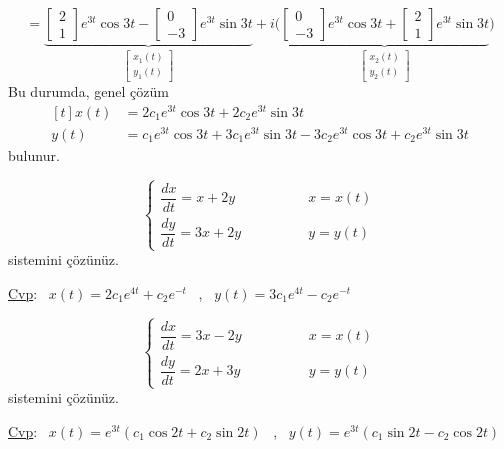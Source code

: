 \documentclass[11pt,a4paper]{article}
\begin{document}
\begin{cozum}
\[= \underbrace{\begin{bmatrix} 2 \\ 1 \end{bmatrix}e^{3t}\cos 3t - \begin{bmatrix} 0 \\ -3 \end{bmatrix}e^{3t}\sin 3t}_{\begin{bmatrix} x_1(t) \\ y_1(t) \end{bmatrix}} + i\Biggl(\underbrace{\begin{bmatrix} 0 \\ -3 \end{bmatrix}e^{3t}\cos 3t + \begin{bmatrix} 2 \\ 1 \end{bmatrix}e^{3t}\sin 3t}_{\begin{bmatrix} x_2(t) \\ y_2(t) \end{bmatrix}}\Biggr)
\]
Bu durumda, genel çözüm
\[
\begin{aligned}[t] x(t) &= 2c_1e^{3t}\cos 3t + 2c_2e^{3t}\sin 3t \\ y(t) &= c_1e^{3t}\cos 3t + 3c_1e^{3t}\sin 3t - 3c_2e^{3t}\cos 3t + c_2e^{3t}\sin 3t \end{aligned}
\]
bulunur.
\end{cozum}

\begin{ornek}[(ÖDEV)]
\[
\begin{cases} \dfrac{dx}{dt} = x + 2y & \qquad\qquad x = x(t) \\[3mm] \dfrac{dy}{dt} = 3x + 2y & \qquad\qquad y = y(t) \end{cases}
\]
sistemini çözünüz.

\underline{Cvp}: \ $x(t) = 2c_1e^{4t} + c_2e^{-t}$ \ , \ $y(t) = 3c_1e^{4t} - c_2e^{-t}$
\end{ornek}

\begin{ornek}[(ÖDEV)]
\[
\begin{cases} \dfrac{dx}{dt} = 3x - 2y & \qquad\qquad x = x(t) \\[3mm] \dfrac{dy}{dt} = 2x + 3y & \qquad\qquad y = y(t) \end{cases}
\]
sistemini çözünüz.

\underline{Cvp}: \ $x(t) = e^{3t}\left(c_1\cos 2t + c_2\sin 2t\right)$ \ , \ $y(t) = e^{3t}\left(c_1\sin 2t - c_2\cos 2t\right)$
\end{ornek}
\end{document}
